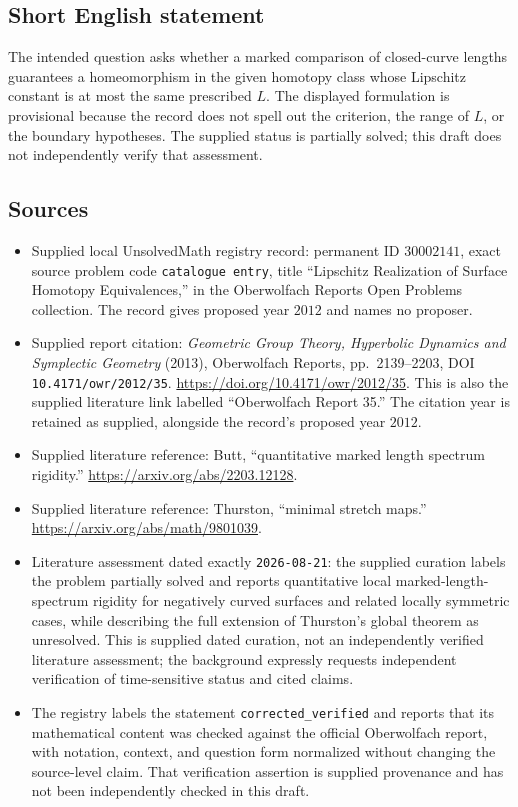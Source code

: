 \documentclass[11pt]{article}
\begin{document}
\subsection{Short English statement}
The intended question asks whether a marked comparison of closed-curve lengths guarantees a homeomorphism in the given homotopy class whose Lipschitz constant is at most the same prescribed \(L\). The displayed formulation is provisional because the record does not spell out the criterion, the range of \(L\), or the boundary hypotheses. The supplied status is partially solved; this draft does not independently verify that assessment.
\subsection{Sources}
\begin{itemize}
\item Supplied local UnsolvedMath registry record: permanent ID \(30002141\), exact source problem code \texttt{catalogue entry}, title ``Lipschitz Realization of Surface Homotopy Equivalences,'' in the Oberwolfach Reports Open Problems collection. The record gives proposed year \(2012\) and names no proposer.
\item Supplied report citation: \emph{Geometric Group Theory, Hyperbolic Dynamics and Symplectic Geometry} (2013), Oberwolfach Reports, pp.~2139--2203, DOI \texttt{10.4171/owr/2012/35}. \url{https://doi.org/10.4171/owr/2012/35}. This is also the supplied literature link labelled ``Oberwolfach Report 35.'' The citation year is retained as supplied, alongside the record's proposed year \(2012\).
\item Supplied literature reference: Butt, ``quantitative marked length spectrum rigidity.'' \url{https://arxiv.org/abs/2203.12128}.
\item Supplied literature reference: Thurston, ``minimal stretch maps.'' \url{https://arxiv.org/abs/math/9801039}.
\item Literature assessment dated exactly \texttt{2026-08-21}: the supplied curation labels the problem partially solved and reports quantitative local marked-length-spectrum rigidity for negatively curved surfaces and related locally symmetric cases, while describing the full extension of Thurston's global theorem as unresolved. This is supplied dated curation, not an independently verified literature assessment; the background expressly requests independent verification of time-sensitive status and cited claims.
\item The registry labels the statement \texttt{corrected\_verified} and reports that its mathematical content was checked against the official Oberwolfach report, with notation, context, and question form normalized without changing the source-level claim. That verification assertion is supplied provenance and has not been independently checked in this draft.
\end{itemize}
\end{document}
